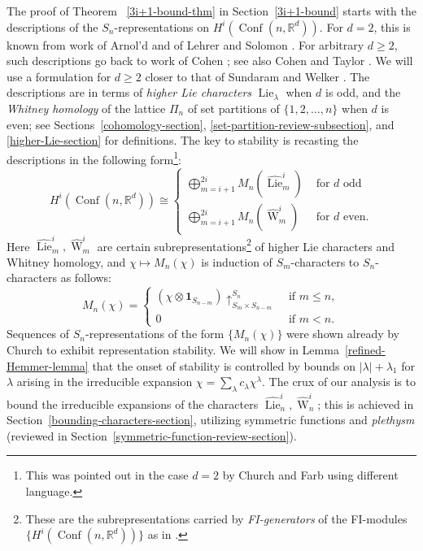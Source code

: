 \documentclass[12pt]{amsart}
\theoremstyle{plain}
\theoremstyle{definition}
\begin{document}
The proof of Theorem ~\ref{3i+1-bound-thm}
in Section~\ref{3i+1-bound} starts with the 
descriptions of the $S_n$-representations on
$
H^i({{\operatorname{Conf}}}(n,{{\mathbb{R}}}^d)).
$
For $d=2$, this is known from work of Arnol'd \cite{Arnold} and 
of Lehrer and Solomon \cite{LehrerSolomon}.
For arbitrary $d \geq 2$, such descriptions go back to work of 
Cohen \cite[Chap. III]{CohenLadaMay}; see also
Cohen and Taylor \cite{CohenTaylor}.  
We will use a formulation
for $d \geq 2$ closer to that of Sundaram and Welker \cite{SundaramWelker}.  
The descriptions are 
in terms of {\it higher Lie characters} ${{\operatorname{Lie}}}_\lambda$ when $d$ is odd,
and the {\it Whitney homology} of the lattice $\Pi_n$ of set partitions of $\{1,2,\ldots,n\}$
when $d$ is even;
see Sections~\ref{cohomology-section}, 
\ref{set-partition-review-subsection}, and 
\ref{higher-Lie-section} for definitions.  The key to
stability is recasting the descriptions in the following form\footnote{This was pointed out in the case $d=2$ 
by Church and Farb \cite[\S 4.1]{Church-Farb} using different language.}: 
 $$
H^i({{\operatorname{Conf}}}(n,{{\mathbb{R}}}^d)) \cong
\begin{cases} 
\displaystyle\bigoplus_{m=i+1}^{2i} M_n(\widehat{{\operatorname{Lie}}}_m^i) & \text{ for }d\text{ odd}\\
\displaystyle\bigoplus_{m=i+1}^{2i} M_n(\widehat{{\operatorname{W}}}_m^i) & \text{ for }d\text{ even}.
 \end{cases}
$$ 
Here $\widehat{{\operatorname{Lie}}}^i_m, \widehat{{\operatorname{W}}}^i_m$ are certain subrepresentations\footnote{These are the subrepresentations carried by {\it FI-generators} 
of the FI-modules $\{H^i({{\operatorname{Conf}}}(n,{{\mathbb{R}}}^d))\}$ as in \cite{CEF}.}
of higher Lie characters and Whitney homology, and 
$\chi \mapsto M_n(\chi)$ is induction of $S_m$-characters to $S_n$-characters as follows:
$$
M_n(\chi)=\begin{cases}
\left( \chi \otimes {{\mathbf{1}}}_{S_{n-m}} \right) 
  \uparrow_{S_{m} \times S_{n-m}}^{S_n}& \text{ if }m \leq n,\\
0 & \text{ if }m < n.
\end{cases}
$$
Sequences of $S_n$-representations of the form $\{M_n(\chi)\}$ were shown already by 
Church \cite{Church} to exhibit representation stability.
We will show in Lemma~\ref{refined-Hemmer-lemma} that the onset
of stability is controlled by bounds on  $|\lambda|+\lambda_1$ 
for $\lambda$ arising
in the irreducible expansion $\chi=\sum_\lambda c_\lambda \chi^\lambda$.
The crux of our analysis is to bound the irreducible expansions of the
characters $\widehat{{\operatorname{Lie}}}^i_n, \widehat{{\operatorname{W}}}^i_n$;  this is achieved 
in Section~\ref{bounding-characters-section},
utilizing symmetric functions and {\it plethysm} 
(reviewed in Section~\ref{symmetric-function-review-section}).
\end{document}
